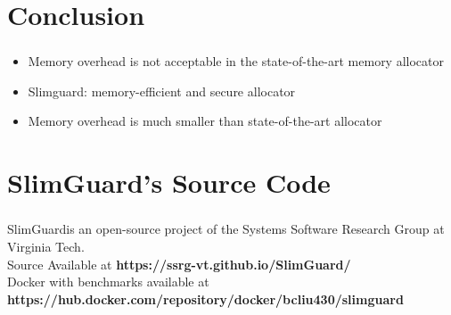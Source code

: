 \documentclass{beamer}
\begin{document}
\section{Conclusion}
\begin{frame}
	\frametitle{\secname}

            \begin{itemize}
                \item Memory overhead is not acceptable in the state-of-the-art memory allocator
                \item Slimguard: memory-efficient and secure allocator
                \item Memory overhead is much smaller than state-of-the-art allocator
            \end{itemize}
\end{frame}

\section{SlimGuard's Source Code}
\begin{frame}

    \frametitle{\secname}
    SlimGuard\footnotemark is an open-source project of the Systems Software Research Group
    at Virginia Tech.
\\
    Source Available at \textbf{https://ssrg-vt.github.io/SlimGuard/}
\\
    Docker with benchmarks available at \\
    \textbf{https://hub.docker.com/repository/docker/bcliu430/slimguard}

\end{frame}
\end{document}

